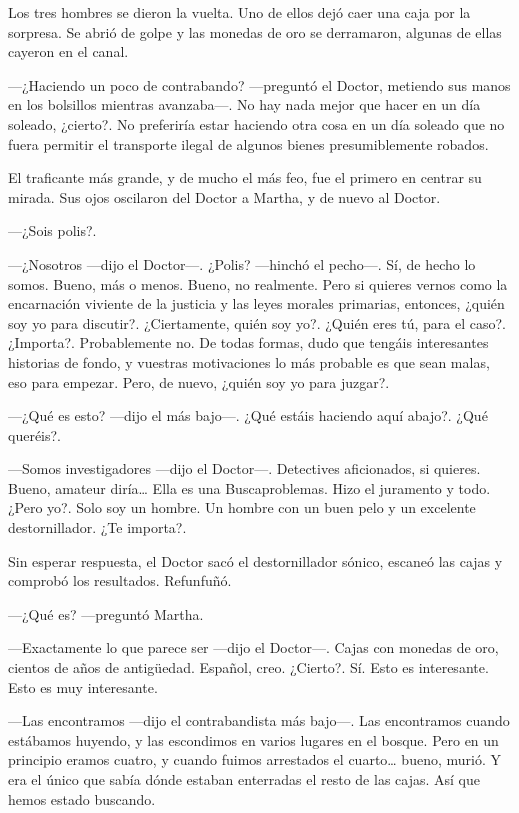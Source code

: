 Los tres hombres se dieron la vuelta. Uno de ellos dejó caer una caja por la sorpresa. Se abrió de golpe y las monedas de oro se derramaron, algunas de ellas cayeron en el canal.

---¿Haciendo un poco de contrabando? ---preguntó el Doctor, metiendo sus manos en los bolsillos mientras avanzaba---. No hay nada mejor que hacer en un día soleado, ¿cierto?. No preferiría estar haciendo otra cosa en un día soleado que no fuera permitir el transporte ilegal de algunos bienes presumiblemente robados.

El traficante más grande, y de mucho el más feo, fue el primero en centrar su mirada. Sus ojos oscilaron del Doctor a Martha, y de nuevo al Doctor.

---¿Sois polis?.

---¿Nosotros ---dijo el Doctor---. ¿Polis? ---hinchó el pecho---. Sí, de hecho lo somos. Bueno, más o menos. Bueno, no realmente. Pero si quieres vernos como la encarnación viviente de la justicia y las leyes morales primarias, entonces, ¿quién soy yo para discutir?. ¿Ciertamente, quién soy yo?. ¿Quién eres tú, para el caso?. ¿Importa?. Probablemente no. De todas formas, dudo que tengáis interesantes historias de fondo, y vuestras motivaciones lo más probable es que sean malas, eso para empezar. Pero, de nuevo, ¿quién soy yo para juzgar?.

---¿Qué es esto? ---dijo el más bajo---. ¿Qué estáis haciendo aquí abajo?. ¿Qué queréis?.

---Somos investigadores ---dijo el Doctor---. Detectives aficionados, si quieres. Bueno, amateur diría\ldots{} Ella es una Buscaproblemas. Hizo el juramento y todo. ¿Pero yo?. Solo soy un hombre. Un hombre con un buen pelo y un excelente destornillador. ¿Te importa?.

Sin esperar respuesta, el Doctor sacó el destornillador sónico, escaneó las cajas y comprobó los resultados. Refunfuñó.

---¿Qué es? ---preguntó Martha.

---Exactamente lo que parece ser ---dijo el Doctor---. Cajas con monedas de oro, cientos de años de antigüedad. Español, creo. ¿Cierto?. Sí. Esto es interesante. Esto es muy interesante.

---Las encontramos ---dijo el contrabandista más bajo---. Las encontramos cuando estábamos huyendo, y las escondimos en varios lugares en el bosque. Pero en un principio eramos cuatro, y cuando fuimos arrestados el cuarto\ldots{} bueno, murió. Y era el único que sabía dónde estaban enterradas el resto de las cajas. Así que hemos estado buscando.

